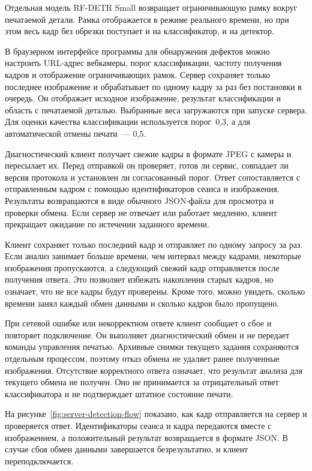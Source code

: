 Отдельная модель RF-DETR Small возвращает ограничивающую рамку вокруг печатаемой детали. Рамка отображается в режиме реального времени, но при этом весь кадр без обрезки поступает и на классификатор, и на детектор.

В браузерном интерфейсе программы для обнаружения дефектов можно настроить URL-адрес вебкамеры, порог классификации, частоту получения кадров и отображение ограничивающих рамок. Сервер сохраняет только последнее изображение и обрабатывает по одному кадру за раз без постановки в очередь. Он отображает исходное изображение, результат классификации и область с печатаемой деталью. Выбранные веса загружаются при запуске сервера. Для оценки качества классификации используется порог~0,3, а для автоматической отмены печати~--- 0,5.

Диагностический клиент получает свежие кадры в формате JPEG с камеры и пересылает их. Перед отправкой он проверяет, готов ли сервис, совпадает ли версия протокола и установлен ли согласованный порог. Ответ сопоставляется с отправленным кадром с помощью идентификаторов сеанса и изображения. Результаты возвращаются в виде обычного JSON-файла для просмотра и проверки обмена. Если сервер не отвечает или работает медленно, клиент прекращает ожидание по истечении заданного времени.

Клиент сохраняет только последний кадр и отправляет по одному запросу за раз. Если анализ занимает больше времени, чем интервал между кадрами, некоторые изображения пропускаются, а следующий свежий кадр отправляется после получения ответа. Это позволяет избежать накопления старых кадров, но означает, что не все кадры будут проверены. Кроме того, можно увидеть, сколько времени занял каждый обмен данными и сколько кадров было пропущено.

При сетевой ошибке или некорректном ответе клиент сообщает о сбое и повторяет подключение. Он выполняет диагностический обмен и не передает команды управления печатью. Архивные снимки текущего задания сохраняются отдельным процессом, поэтому отказ обмена не удаляет ранее полученные изображения. Отсутствие корректного ответа означает, что результат анализа для текущего обмена не получен. Оно не принимается за отрицательный ответ классификатора и не подтверждает штатное состояние печати.

На рисунке~\ref{fig:server-detection-flow} показано, как кадр отправляется на сервер и проверяется ответ.  Идентификаторы сеанса и кадра передаются вместе с изображением, а положительный результат возвращается в формате JSON.  В случае сбоя обмен данными завершается безрезультатно, и клиент переподключается.

